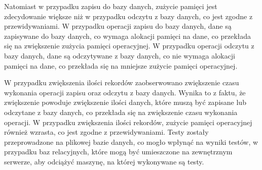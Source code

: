Natomiast w przypadku zapisu do bazy danych, zużycie pamięci jest zdecydowanie większe niż w przypadku odczytu z bazy danych, co jest zgodne z przewidywaniami. W przypadku operacji zapisu do bazy danych, dane są zapisywane do bazy danych, co wymaga alokacji pamięci na dane, co przekłada się na zwiększenie zużycia pamięci operacyjnej. W przypadku operacji odczytu z bazy danych, dane są odczytywane z bazy danych, co nie wymaga alokacji pamięci na dane, co przekłada się na mniejsze zużycie pamięci operacyjnej.

W przypadku zwiększenia ilości rekordów zaobserwowano zwiększenie czasu wykonania operacji zapisu oraz odczytu z bazy danych. Wynika to z faktu, że zwiększenie powoduje zwiększenie ilości danych, które muszą być zapisane lub odczytane z bazy danych, co przekłada się na zwiększenie czasu wykonania operacji. W przypadku zwiększenia ilości rekordów, zużycie pamięci operacyjnej również wzrasta, co jest zgodne z przewidywaniami. Testy zostały przeprowadzone na plikowej bazie danych, co mogło wpłynąć na wyniki testów, w przypadku baz relacyjnych, które mogą być umieszczone na zewnętrznym serwerze, aby odciążyć maszynę, na której wykonywane są testy.
